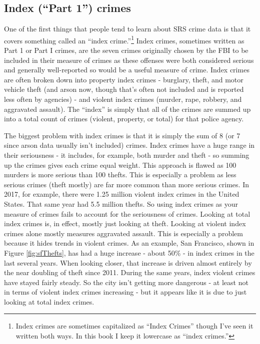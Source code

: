\documentclass[
]{krantz}
\begin{document}
\subsection{Index (``Part 1'') crimes}\label{indexCrimes}

One of the first things that people tend to learn about SRS
crime data is that it covers something called an ``index
crime.''\footnote{Index crimes are sometimes capitalized as
  ``Index Crimes'' though I've seen it written both ways. In
  this book I keep it lowercase as ``index crimes.''} Index
crimes, sometimes written as Part 1 or Part I crimes, are
the seven crimes originally chosen by the FBI to be included
in their measure of crimes as these offenses were both
considered serious and generally well-reported so would be a
useful measure of crime. Index crimes are often broken down
into property index crimes - burglary, theft, and motor
vehicle theft (and arson now, though that's often not
included and is reported less often by agencies) - and
violent index crimes (murder, rape, robbery, and aggravated
assault). The ``index'' is simply that all of the crimes are
summed up into a total count of crimes (violent, property,
or total) for that police agency.

The biggest problem with index crimes is that it is simply
the sum of 8 (or 7 since arson data usually isn't included)
crimes. Index crimes have a huge range in their seriousness
- it includes, for example, both murder and theft - so
summing up the crimes gives each crime equal weight. This
approach is flawed as 100 murders is more serious than 100
thefts. This is especially a problem as less serious crimes
(theft mostly) are far more common than more serious crimes.
In 2017, for example, there were 1.25 million violent index
crimes in the United States. That same year had 5.5 million
thefts. So using index crimes as your measure of crimes
fails to account for the seriousness of crimes. Looking at
total index crimes is, in effect, mostly just looking at
theft. Looking at violent index crimes alone mostly measures
aggravated assault. This is especially a problem because it
hides trends in violent crimes. As an example, San
Francisco, shown in Figure \ref{fig:sfThefts}, has had a
huge increase - about 50\% - in index crimes in the last
several years. When looking closer, that increase is driven
almost entirely by the near doubling of theft since 2011.
During the same years, index violent crimes have stayed
fairly steady. So the city isn't getting more dangerous - at
least not in terms of violent index crimes increasing - but
it appears like it is due to just looking at total index
crimes.
\end{document}
